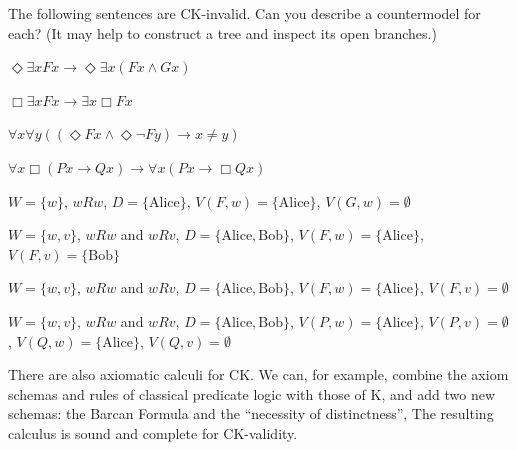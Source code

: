 \begin{exercise}
  The following sentences are CK-invalid. Can you describe a countermodel for
  each? (It may help to construct a tree and inspect its open branches.)
  \begin{exlist}
    \item $\Diamond \exists x Fx \to \Diamond\exists x(Fx \land Gx)$
    \item $\Box \exists x Fx \to \exists x \Box Fx$
    \item
    $\forall x \forall y ((\Diamond Fx \land \Diamond \neg Fy) \to x\!\not=\!y)$
    \item $\forall x \Box (Px \to Qx) \to \forall x (Px \to \Box Qx)$
  \end{exlist}
\end{exercise}
\begin{solution}
  \begin{sollist}
    \item $W=\{ w \}$, $wRw$, $D = \{ \text{Alice} \}$,
    $V(F,w) = \{ \text{Alice} \}$, $V(G,w) = \emptyset$
    \item $W=\{ w,v \}$, $wRw$ and $wRv$, $D = \{ \text{Alice}, \text{Bob} \}$,
    $V(F,w) = \{ \text{Alice} \}$, $V(F,v) = \{ \text{Bob} \}$
    \item $W=\{ w,v \}$, $wRw$ and $wRv$, $D = \{ \text{Alice}, \text{Bob} \}$,
    $V(F,w) = \{ \text{Alice} \}$, $V(F,v) = \emptyset$
    \item $W=\{ w,v \}$, $wRw$ and $wRv$, $D = \{ \text{Alice}, \text{Bob} \}$,
    $V(P,w) = \{ \text{Alice} \}$, $V(P,v) = \emptyset$,
    $V(Q,w) = \{ \text{Alice} \}$, $V(Q,v) = \emptyset$
  \end{sollist}
\end{solution}

There are also axiomatic calculi for CK. We can, for example, combine the axiom
schemas and rules of classical predicate logic with those of K, and add two new
schemas: the Barcan Formula  and the ``necessity of distinctness'',
%
%
The resulting calculus is sound and complete for CK-validity.

